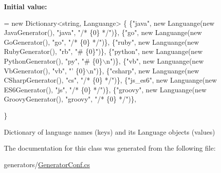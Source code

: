 {\bfseries Initial value\+:}
\begin{DoxyCode}
= \textcolor{keyword}{new} Dictionary<string, Languange>
        \{
            \{\textcolor{stringliteral}{"java"}, \textcolor{keyword}{new} Languange(\textcolor{keyword}{new} JavaGenerator(), \textcolor{stringliteral}{"java"}, \textcolor{stringliteral}{"/* \{0\} */"})\},
            \{\textcolor{stringliteral}{"go"}, \textcolor{keyword}{new} Languange(\textcolor{keyword}{new} GoGenerator(), \textcolor{stringliteral}{"go"}, \textcolor{stringliteral}{"/* \{0\} */"})\},
            \{\textcolor{stringliteral}{"ruby"}, \textcolor{keyword}{new} Languange(\textcolor{keyword}{new} RubyGenerator(), \textcolor{stringliteral}{"rb"}, \textcolor{stringliteral}{"# \{0\}"})\},
            \{\textcolor{stringliteral}{"python"}, \textcolor{keyword}{new} Languange(\textcolor{keyword}{new} PythonGenerator(), \textcolor{stringliteral}{"py"}, \textcolor{stringliteral}{"# \{0\}\(\backslash\)n"})\},
            \{\textcolor{stringliteral}{"vb"}, \textcolor{keyword}{new} Languange(\textcolor{keyword}{new} VbGenerator(), \textcolor{stringliteral}{"vb"}, \textcolor{stringliteral}{"' \{0\}\(\backslash\)n"})\},
            \{\textcolor{stringliteral}{"csharp"}, \textcolor{keyword}{new} Languange(\textcolor{keyword}{new} CSharpGenerator(), \textcolor{stringliteral}{"cs"}, \textcolor{stringliteral}{"/* \{0\} */"})\},
            \{\textcolor{stringliteral}{"js\_es6"}, \textcolor{keyword}{new} Languange(\textcolor{keyword}{new} ES6Generator(), \textcolor{stringliteral}{"js"}, \textcolor{stringliteral}{"/* \{0\} */"})\},
            \{\textcolor{stringliteral}{"groovy"}, \textcolor{keyword}{new} Languange(\textcolor{keyword}{new} GroovyGenerator(), \textcolor{stringliteral}{"groovy"}, \textcolor{stringliteral}{"/* \{0\} */"})\},
            
            
        \}
\end{DoxyCode}


Dictionary of language names (keys) and its Language objects (values) 



The documentation for this class was generated from the following file\+:\begin{DoxyCompactItemize}
\item 
generators/\mbox{\hyperlink{GeneratorConf_8cs}{Generator\+Conf.\+cs}}\end{DoxyCompactItemize}
